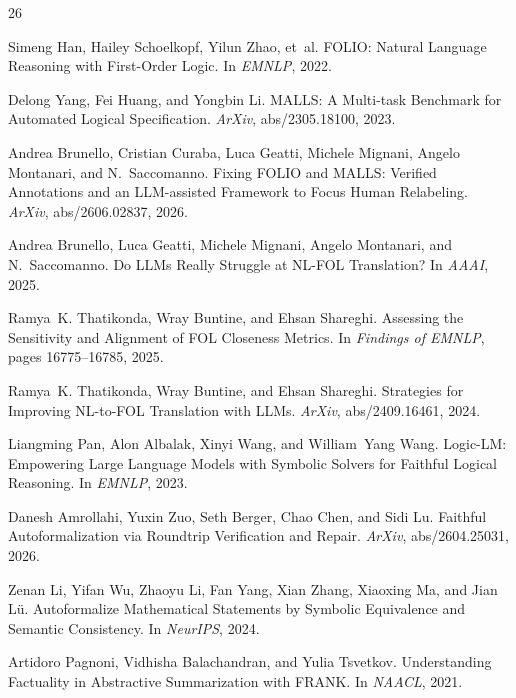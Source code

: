 \documentclass[11pt,letterpaper]{article}
\begin{document}
\begin{thebibliography}{26}

Simeng Han, Hailey Schoelkopf, Yilun Zhao, et~al.
\newblock FOLIO: Natural Language Reasoning with First-Order Logic.
\newblock In \emph{EMNLP}, 2022.

Delong Yang, Fei Huang, and Yongbin Li.
\newblock MALLS: A Multi-task Benchmark for Automated Logical Specification.
\newblock \emph{ArXiv}, abs/2305.18100, 2023.

Andrea Brunello, Cristian Curaba, Luca Geatti, Michele Mignani, Angelo Montanari, and N.~Saccomanno.
\newblock Fixing FOLIO and MALLS: Verified Annotations and an LLM-assisted Framework to Focus Human Relabeling.
\newblock \emph{ArXiv}, abs/2606.02837, 2026.

Andrea Brunello, Luca Geatti, Michele Mignani, Angelo Montanari, and N.~Saccomanno.
\newblock Do LLMs Really Struggle at NL-FOL Translation?
\newblock In \emph{AAAI}, 2025.

Ramya~K. Thatikonda, Wray Buntine, and Ehsan Shareghi.
\newblock Assessing the Sensitivity and Alignment of FOL Closeness Metrics.
\newblock In \emph{Findings of EMNLP}, pages 16775--16785, 2025.

Ramya~K. Thatikonda, Wray Buntine, and Ehsan Shareghi.
\newblock Strategies for Improving NL-to-FOL Translation with LLMs.
\newblock \emph{ArXiv}, abs/2409.16461, 2024.

Liangming Pan, Alon Albalak, Xinyi Wang, and William~Yang Wang.
\newblock Logic-LM: Empowering Large Language Models with Symbolic Solvers for Faithful Logical Reasoning.
\newblock In \emph{EMNLP}, 2023.

Danesh Amrollahi, Yuxin Zuo, Seth Berger, Chao Chen, and Sidi Lu.
\newblock Faithful Autoformalization via Roundtrip Verification and Repair.
\newblock \emph{ArXiv}, abs/2604.25031, 2026.

Zenan Li, Yifan Wu, Zhaoyu Li, Fan Yang, Xian Zhang, Xiaoxing Ma, and Jian L\"u.
\newblock Autoformalize Mathematical Statements by Symbolic Equivalence and Semantic Consistency.
\newblock In \emph{NeurIPS}, 2024.

Artidoro Pagnoni, Vidhisha Balachandran, and Yulia Tsvetkov.
\newblock Understanding Factuality in Abstractive Summarization with FRANK.
\newblock In \emph{NAACL}, 2021.


\end{thebibliography}
\end{document}
